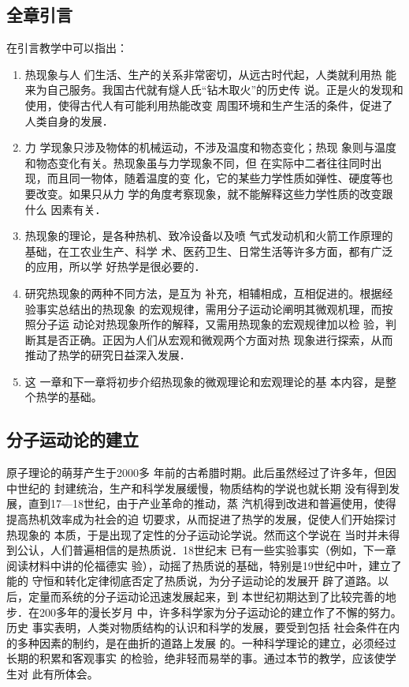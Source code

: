 \subsection{全章引言}
在引言教学中可以指出：
\begin{enumerate}
    \item 热现象与人
们生活、生产的关系非常密切，从远古时代起，人类就利用热
能来为自己服务。我国古代就有燧人氏“钻木取火”的历史传
说。正是火的发现和使用，使得古代人有可能利用热能改变
周围环境和生产生活的条件，促进了人类自身的发展．
\item 力
学现象只涉及物体的机械运动，不涉及温度和物态变化；热现
象则与温度和物态变化有关。热现象虽与力学现象不同，但
在实际中二者往往同时出现，而且同一物体，随着温度的变
化，它的某些力学性质如弹性、硬度等也要改变。如果只从力
学的角度考察现象，就不能解释这些力学性质的改变跟什么
因素有关．  
\item 热现象的理论，是各种热机、致冷设备以及喷
气式发动机和火箭工作原理的基础，在工农业生产、科学
术、医药卫生、日常生活等许多方面，都有广泛的应用，所以学
好热学是很必要的．  
\item 研究热现象的两种不同方法，是互为
补充，相辅相成，互相促进的。根据经验事实总结出的热现象
的宏观规律，需用分子运动论阐明其微观机理，而按照分子运
动论对热现象所作的解释，又需用热现象的宏观规律加以检
验，判断其是否正确。正因为人们从宏观和微观两个方面对热
现象进行探索，从而推动了热学的研究日益深入发展．
\item 这
一章和下一章将初步介绍热现象的微观理论和宏观理论的基
本内容，是整个热学的基础。
\end{enumerate}

\subsection{分子运动论的建立} 原子理论的萌芽产生于2000多
年前的古希腊时期。此后虽然经过了许多年，但因中世纪的
封建统治，生产和科学发展缓慢，物质结构的学说也就长期
没有得到发展，直到17—18世纪，由于产业革命的推动，蒸
汽机得到改进和普遍使用，使得提高热机效率成为社会的迫
切要求，从而捉进了热学的发展，促使人们开始探讨热现象的
本质，于是出现了定性的分子运动论学说。然而这个学说在
当时并未得到公认，人们普遍相信的是热质说．18世纪末
已有一些实验事实（例如，下一章阅读材料中讲的伦福德实
验），动摇了热质说的基础，特别是19世纪中叶，建立了能的
守恒和转化定律彻底否定了热质说，为分子运动论的发展开
辟了道路。以后，定量而系统的分子运动论迅速发展起来，到
本世纪初期达到了比较完善的地步．在200多年的漫长岁月
中，许多科学家为分子运动论的建立作了不懈的努力。历史
事实表明，人类对物质结构的认识和科学的发展，要受到包括
社会条件在内的多种因素的制约，是在曲折的道路上发展
的。一种科学理论的建立，必须经过长期的积累和客观事实
的检验，绝非轻而易举的事。通过本节的教学，应该使学生对
此有所体会。

